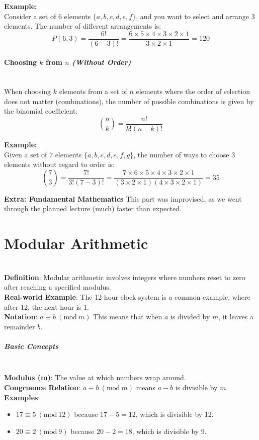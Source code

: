 \documentclass[]{article}
\begin{document}
	\textbf{Example:}
	\noindent\\
	Consider a set of 6 elements $\{a, b, c, d, e, f\}$, and you want to select and arrange 3 elements. The number of different arrangements is:
	$$
	P(6, 3)
	= \frac{6!}{(6-3)!}
	= \frac{6 \times 5 \times 4 \times 3 \times 2 \times 1}{3 \times 2 \times 1}
	= 120
	$$
	
	\paragraph{Choosing $k$ from $n$ \textit{(Without Order)}}
	\noindent\\
	When choosing $k$ elements from a set of $n$ elements where the order of selection does not matter (combinations), the number of possible combinations is given by the binomial coefficient:
	$$
	\binom{n}{k} = \frac{n!}{k!(n-k)!}
	$$
	
	\textbf{Example:}
	\noindent\\
	Given a set of 7 elements $\{a, b, c, d, e, f, g\}$, the number of ways to choose 3 elements without regard to order is:
	$$
	\binom{7}{3}
	= \frac{7!}{3!(7-3)!}
	= \frac{7 \times 6 \times 5 \times 4 \times 3 \times 2 \times 1}{(3 \times 2 \times 1)(4 \times 3 \times 2 \times 1)}
	= 35
	$$
	
	\newpage
	\textbf{{\LARGE Extra: Fundamental Mathematics}}
	This part was improvised, as we went through the planned lecture (much) faster than expected.
	
	\section*{Modular Arithmetic}
	\noindent \\
	\textbf{Definition}: Modular arithmetic involves integers where numbers reset to zero after reaching a specified modulus.
	\noindent \\
	\textbf{Real-world Example}: The 12-hour clock system is a common example, where after 12, the next hour is 1.
	\noindent \\
	\textbf{Notation}: $a \equiv b \ (\text{mod} \ m)$
	This means that when $a$ is divided by $m$, it leaves a remainder $b$.

	
	\subparagraph{Basic Concepts}
	\noindent \\
	\textbf{Modulus (m)}: The value at which numbers wrap around.
	\noindent \\
	\textbf{Congruence Relation}: $a \equiv b \ (\text{mod} \ m)$ means $a - b$ is divisible by $m$.
	\noindent \\
	\textbf{Examples}:
	\begin{itemize}
		\item $17 \equiv 5 \ (\text{mod} \ 12)$ because $17 - 5 = 12$, which is divisible by 12.
		\item $20 \equiv 2 \ (\text{mod} \ 9)$ because $20 - 2 = 18$, which is divisible by 9.
	\end{itemize}
\end{document}
